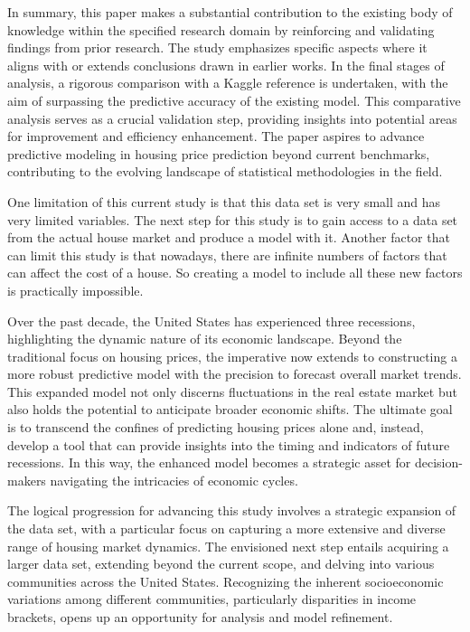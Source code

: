 \documentclass[12pt]{article}
\begin{document}
In summary, this paper makes a substantial contribution to the existing body of knowledge within the specified research domain by reinforcing and validating findings from prior research. The study emphasizes specific aspects where it aligns with or extends conclusions drawn in earlier works. In the final stages of analysis, a rigorous comparison with a Kaggle reference is undertaken, with the aim of surpassing the predictive accuracy of the existing model. This comparative analysis serves as a crucial validation step, providing insights into potential areas for improvement and efficiency enhancement. The paper aspires to advance predictive modeling in housing price prediction beyond current benchmarks, contributing to the evolving landscape of statistical methodologies in the field.

One limitation of this current study is that this data set is very small and has very limited variables. The next step for this study is to gain access to a data set from the actual house market and produce a model with it. Another factor that can limit this study is that nowadays, there are infinite numbers of factors that can affect the cost of a house. So creating a model to include all these new factors is practically impossible. 

Over the past decade, the United States has experienced three recessions, highlighting the dynamic nature of its economic landscape. Beyond the traditional focus on housing prices, the imperative now extends to constructing a more robust predictive model with the precision to forecast overall market trends. This expanded model not only discerns fluctuations in the real estate market but also holds the potential to anticipate broader economic shifts. The ultimate goal is to transcend the confines of predicting housing prices alone and, instead, develop a tool that can provide insights into the timing and indicators of future recessions. In this way, the enhanced model becomes a strategic asset for decision-makers navigating the intricacies of economic cycles.

The logical progression for advancing this study involves a strategic expansion of the data set, with a particular focus on capturing a more extensive and diverse range of housing market dynamics. The envisioned next step entails acquiring a larger data set, extending beyond the current scope, and delving into various communities across the United States. Recognizing the inherent socioeconomic variations among different communities, particularly disparities in income brackets, opens up an opportunity for analysis and model refinement.
\end{document}

